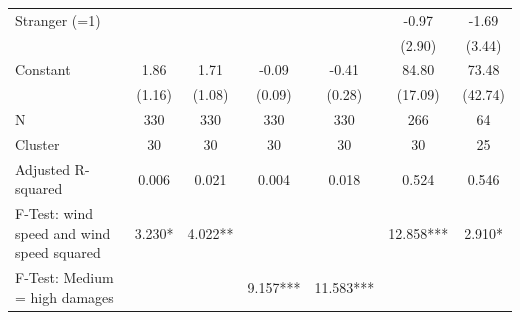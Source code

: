{\begin{tabular}{l*{6}{c}}
Stranger (=1)       &                     &                     &                     &                     &       -0.97         &       -1.69         \\
                    &                     &                     &                     &                     &      (2.90)         &      (3.44)         \\
Constant            &        1.86         &        1.71         &       -0.09         &       -0.41         &       84.80\sym{***}&       73.48\sym{*}  \\
                    &      (1.16)         &      (1.08)         &      (0.09)         &      (0.28)         &     (17.09)         &     (42.74)         \\
\midrule
N                   &         330         &         330         &         330         &         330         &         266         &          64         \\
Cluster             &          30         &          30         &          30         &          30         &          30         &          25         \\
Adjusted R-squared  &       0.006         &       0.021         &       0.004         &       0.018         &       0.524         &       0.546         \\
F-Test: wind speed and wind speed squared&      3.230*         &     4.022**         &                     &                     &   12.858***         &      2.910*         \\
F-Test: Medium = high damages&                     &                     &    9.157***         &   11.583***         &                     &                     \\
\bottomrule
\end{tabular}
}
